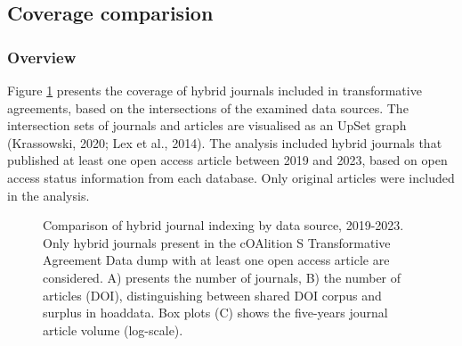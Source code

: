 \documentclass[a4paper,man,floatsintext,longtable,noextraspace,10pt]{apa6}
\begin{document}
\subsection{Coverage comparision}\label{coverage-comparision}

\subsubsection{Overview}\label{overview}

Figure \ref{fig-upset_coverage_results} presents the coverage of hybrid
journals included in transformative agreements, based on the
intersections of the examined data sources. The intersection sets of
journals and articles are visualised as an UpSet graph (Krassowski,
2020; Lex et al., 2014). The analysis included hybrid journals that
published at least one open access article between 2019 and 2023, based
on open access status information from each database. Only original
articles were included in the analysis.

\begin{figure}[ht!]


\caption{\label{fig-upset_coverage_results}Comparison of hybrid journal
indexing by data source, 2019-2023. Only hybrid journals present in the
cOAlition S Transformative Agreement Data dump with at least one open
access article are considered. A) presents the number of journals, B)
the number of articles (DOI), distinguishing between shared DOI corpus
and surplus in hoaddata. Box plots (C) shows the five-years journal
article volume (log-scale).}

\end{figure}%
\end{document}
